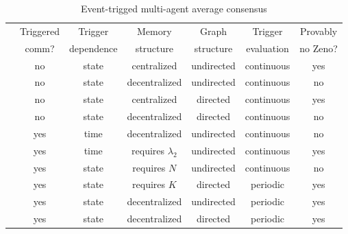 \documentclass[]{book}
\newcommand{\control}{\color{red!95!black}no}
\newcommand{\comm}{\color{green!60!black}yes}
\newcommand{\timeonly}{\color{red!95!black}time}
\newcommand{\state}{\color{green!60!black}state}
\newcommand{\centralized}{\color{red!95!black}centralized}
\newcommand{\decentralized}{\color{green!60!black}decentralized}
\newcommand{\undirected}{\color{red!95!black}undirected}
\newcommand{\directed}{\color{green!60!black}directed}
\newcommand{\continuous}{\color{red!95!black}continuous}
\newcommand{\periodic}{\color{green!60!black}periodic}
\newcommand{\zeno}{\color{red!95!black}no}
\newcommand{\nozeno}{\color{green!60!black}yes}
\begin{document}
\begin{table}
\begin{center}
\begin{tabular}{|l|c|c|c|c|c|c|}
\hline
& Triggered & Trigger  & Memory & Graph & Trigger & Provably \\
& comm? & dependence & structure & structure & evaluation & no Zeno?\\
\hline
[17] & \control & \state & \centralized & \undirected & \continuous & \nozeno \\ 
\hline
[17] & \control & \state & \decentralized & \undirected & \continuous & \zeno \\ 
\hline
[18] & \control & \state & \centralized & \directed & \continuous & \nozeno \\
\hline
[18] & \control & \state & \decentralized & \directed & \continuous & \zeno \\
\hline
[19] & \comm & \timeonly & \decentralized & \undirected & \continuous & \zeno \\
\hline
[19] & \comm & \timeonly & {\color{yellow!70!black}requires $\lambda_2$} & \undirected & \continuous & \nozeno \\
\hline
[20] & \comm & \state & {\color{green!60!black}requires $N$} & \undirected & \continuous & \zeno \\
\hline
[21] & \comm & \state & {\color{yellow!70!black}requires $K$} & \directed & \periodic & \nozeno \\
\hline
[12] & \comm & \state & \decentralized & \undirected & \periodic & \nozeno \\
\hline
[22,23] & \comm & \state & \decentralized & \directed & \periodic & \nozeno \\
\hline
\end{tabular}
\end{center}
\caption{Event-trigged multi-agent average consensus \vspace*{-5ex}}\label{ta:survey}
\end{table}
\end{document}
